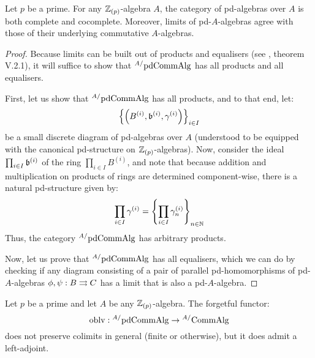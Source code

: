             \begin{proposition}
                Let $p$ be a prime. For any $\mathbb{Z}_{(p)}$-algebra $A$, the category of pd-algebras over $A$ is both complete and cocomplete. Moreover, limits of pd-$A$-algebras agree with those of their underlying commutative $A$-algebras.
            \end{proposition}
                \begin{proof}
                    Because limits can be built out of products and equalisers (see \cite{maclane}, theorem V.2.1), it will suffice to show that ${}^{A/}\mathrm{pd}\mathrm{Comm}\mathrm{Alg}$ has all products and all equalisers.
                    
                    First, let us show that ${}^{A/}\mathrm{pd}\mathrm{Comm}\mathrm{Alg}$ has all products, and to that end, let:
                        $$\left\{\left(B^{(i)}, \mathfrak{b}^{(i)}, \gamma^{(i)}\right)\right\}_{i \in I}$$
                    be a small discrete diagram of pd-algebras over $A$ (understood to be equipped with the canonical pd-structure on $\mathbb{Z}_{(p)}$-algebras). Now, consider the ideal $\prod_{i \in I} \mathfrak{b}^{(i)}$ of the ring $\prod_{i \in I} B^{(i)}$, and note that because addition and multiplication on products of rings are determined component-wise, there is a natural pd-structure given by:
                        $$\prod_{i \in I} \gamma^{(i)} = \left\{\prod_{i \in I} \gamma_n^{(i)}\right\}_{n \in \mathbb{N}}$$
                    Thus, the category ${}^{A/}\mathrm{pd}\mathrm{Comm}\mathrm{Alg}$ has arbitrary products. 
                    
                    Now, let us prove that ${}^{A/}\mathrm{pd}\mathrm{Comm}\mathrm{Alg}$ has all equalisers, which we can do by checking if any diagram consisting of a pair of parallel pd-homomorphisms of pd-$A$-algebras $\phi, \psi: B \rightrightarrows C$ has a limit that is also a pd-$A$-algebra.  
                \end{proof}
            \begin{corollary} \label{coro: free_pd_algebras}
                Let $p$ be a prime and let $A$ be any $\mathbb{Z}_{(p)}$-algebra. The forgetful functor:
                    $$\mathrm{oblv}: {}^{A/}\mathrm{pd}\mathrm{Comm}\mathrm{Alg} \to {}^{A/}\mathrm{Comm}\mathrm{Alg}$$
                does not preserve colimits in general (finite or otherwise), but it does admit a left-adjoint.
            \end{corollary}
